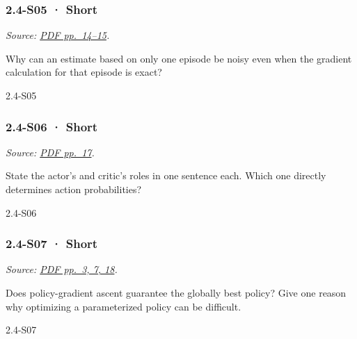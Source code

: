 \noindent\begin{minipage}{\linewidth}

\subsubsection{2.4-S05 · Short}\label{s05-short-6}

\emph{Source:
\href{../Lecture\%20Slides/2.4.\%20Policy\%20Search.pdf\#page=14}{PDF
pp.~14--15}.}

Why can an estimate based on only one episode be noisy even when the
gradient calculation for that episode is exact?

\begin{solution}[20mm]{2.4-S05}

\end{solution}
\end{minipage}\par\medskip

\noindent\begin{minipage}{\linewidth}

\subsubsection{2.4-S06 · Short}\label{s06-short-6}

\emph{Source:
\href{../Lecture\%20Slides/2.4.\%20Policy\%20Search.pdf\#page=17}{PDF
pp.~17}.}

State the actor's and critic's roles in one sentence each. Which one
directly determines action probabilities?

\begin{solution}[20mm]{2.4-S06}

\end{solution}
\end{minipage}\par\medskip

\noindent\begin{minipage}{\linewidth}

\subsubsection{2.4-S07 · Short}\label{s07-short-6}

\emph{Source:
\href{../Lecture\%20Slides/2.4.\%20Policy\%20Search.pdf\#page=3}{PDF
pp.~3, 7, 18}.}

Does policy-gradient ascent guarantee the globally best policy? Give one
reason why optimizing a parameterized policy can be difficult.

\begin{solution}[20mm]{2.4-S07}

\end{solution}
\end{minipage}\par\medskip

